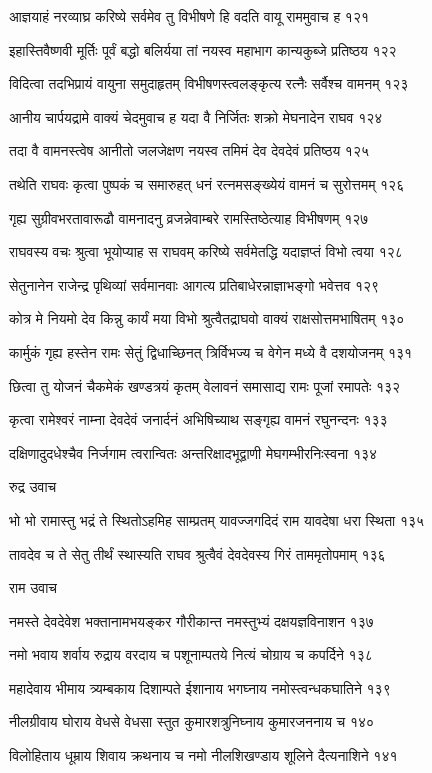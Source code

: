 आज्ञयाहं नरव्याघ्र करिष्ये सर्वमेव तु
विभीषणे हि वदति वायू राममुवाच ह १२१

इहास्तिवैष्णवी मूर्तिः पूर्वं बद्धो बलिर्यया
तां नयस्व महाभाग कान्यकुब्जे प्रतिष्ठय १२२

विदित्वा तदभिप्रायं वायुना समुदाहृतम्
विभीषणस्त्वलङ्कृत्य रत्नैः सर्वैश्च वामनम् १२३

आनीय चार्पयद्रामे वाक्यं चेदमुवाच ह
यदा वै निर्जितः शक्रो मेघनादेन राघव १२४

तदा वै वामनस्त्वेष आनीतो जलजेक्षण
नयस्व तमिमं देव देवदेवं प्रतिष्ठय १२५

तथेति राघवः कृत्वा पुष्पकं च समारुहत्
धनं रत्नमसङ्ख्येयं वामनं च सुरोत्तमम् १२६

गृह्य सुग्रीवभरतावारूढौ वामनादनु
व्रजन्नेवाम्बरे रामस्तिष्ठेत्याह विभीषणम् १२७

राघवस्य वचः श्रुत्वा भूयोप्याह स राघवम्
करिष्ये सर्वमेतद्धि यदाज्ञप्तं विभो त्वया १२८

सेतुनानेन राजेन्द्र पृथिव्यां सर्वमानवाः
आगत्य प्रतिबाधेरन्नाज्ञाभङ्गो भवेत्तव १२९

कोत्र मे नियमो देव किन्नु कार्यं मया विभो
श्रुत्वैतद्राघवो वाक्यं राक्षसोत्तमभाषितम् १३०

कार्मुकं गृह्य हस्तेन रामः सेतुं द्विधाच्छिनत्
त्रिर्विभज्य च वेगेन मध्ये वै दशयोजनम् १३१

छित्वा तु योजनं चैकमेकं खण्डत्रयं कृतम्
वेलावनं समासाद्य रामः पूजां रमापतेः १३२

कृत्वा रामेश्वरं नाम्ना देवदेवं जनार्दनं
अभिषिच्याथ सङ्गृह्य वामनं रघुनन्दनः १३३

दक्षिणादुदधेश्चैव निर्जगाम त्वरान्वितः
अन्तरिक्षादभूद्वाणी मेघगम्भीरनिःस्वना १३४

रुद्र उवाच

भो भो रामास्तु भद्रं ते स्थितोऽहमिह साम्प्रतम्
यावज्जगदिदं राम यावदेषा धरा स्थिता १३५

तावदेव च ते सेतु तीर्थं स्थास्यति राघव
श्रुत्वैवं देवदेवस्य गिरं ताममृतोपमाम् १३६

राम उवाच

नमस्ते देवदेवेश भक्तानामभयङ्कर
गौरीकान्त नमस्तुभ्यं दक्षयज्ञविनाशन १३७

नमो भवाय शर्वाय रुद्राय वरदाय च
पशूनाम्पतये नित्यं चोग्राय च कपर्दिने १३८

महादेवाय भीमाय त्र्यम्बकाय दिशाम्पते
ईशानाय भगघ्नाय नमोस्त्वन्धकघातिने १३९

नीलग्रीवाय घोराय वेधसे वेधसा स्तुत
कुमारशत्रुनिघ्नाय कुमारजननाय च १४०

विलोहिताय धूम्राय शिवाय क्रथनाय च
नमो नीलशिखण्डाय शूलिने दैत्यनाशिने १४१

